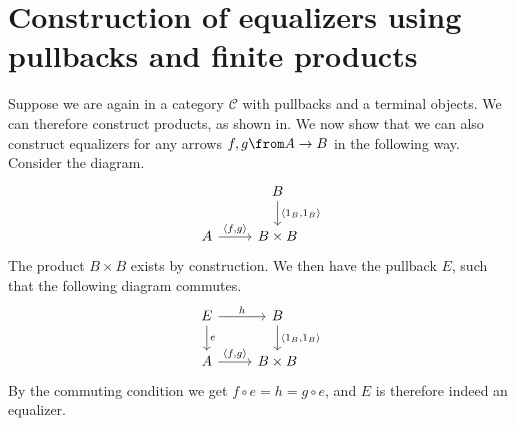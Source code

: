 \section{Construction of equalizers using pullbacks and finite products}

Suppose we are again in a category $\mathscr C$ with pullbacks and a terminal objects.
We can therefore construct products, as shown in. %
We now show that we can also construct equalizers for any arrows $f, g \from A \to B$
in the following way. Consider the diagram.
\[
  \begin{tikzcd}
    & B \arrow{d}{\langle 1_B, 1_B \rangle} \\
    A \arrow{r}{\langle f,g \rangle} & B \times B
  \end{tikzcd}
\]
The product $B \times B$ exists by construction.
We then have the pullback $E$, such that the following diagram commutes.
\[
  \begin{tikzcd}
    E \arrow{r}{h} \arrow{d}{e} & B \arrow{d}{\langle 1_B, 1_B \rangle} \\
    A \arrow{r}{\langle f,g \rangle} & B \times B
  \end{tikzcd}
\]
By the commuting condition we get $f \circ e = h = g \circ e$, and $E$ is therefore
indeed an equalizer.



